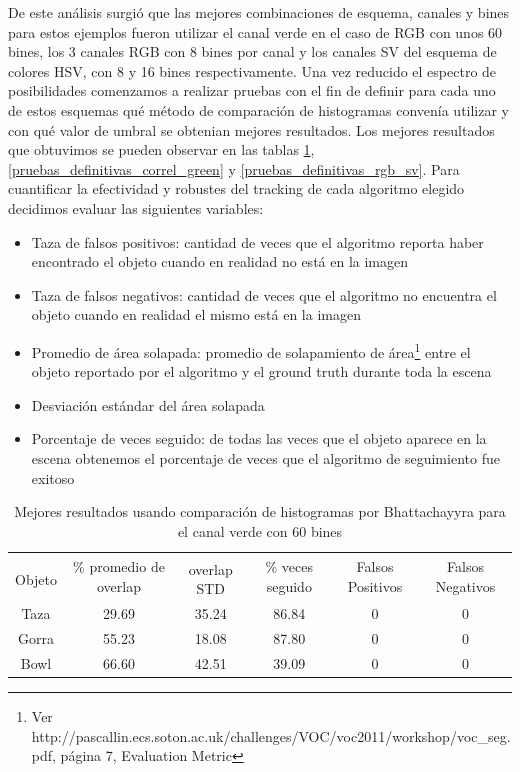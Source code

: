 De este análisis surgió que las mejores combinaciones de esquema, canales y bines para estos ejemplos fueron utilizar el canal verde en el caso de RGB con unos 60 bines, los 3 canales RGB con 8 bines por canal  y los canales SV del esquema de colores HSV, con 8 y 16 bines respectivamente. Una vez reducido el espectro de posibilidades comenzamos a realizar pruebas con el fin de definir para cada uno de estos esquemas qué método de comparación de histogramas convenía utilizar y con qué valor de umbral se obtenian mejores resultados. Los mejores resultados que obtuvimos se pueden observar en las tablas \ref{pruebas_definitivas_bhatta_green}, \ref{pruebas_definitivas_correl_green} y \ref{pruebas_definitivas_rgb_sv}. Para cuantificar la efectividad y robustes del tracking de cada algoritmo elegido decidimos evaluar las siguientes variables:
\begin{itemize}
	\item Taza de falsos positivos: cantidad de veces que el algoritmo reporta haber encontrado el objeto cuando en realidad no está en la imagen
	\item Taza de falsos negativos: cantidad de veces que el algoritmo no encuentra el objeto cuando en realidad el mismo está en la imagen
	\item Promedio de área solapada: promedio de solapamiento de área\footnote{Ver http://pascallin.ecs.soton.ac.uk/challenges/VOC/voc2011/workshop/voc\_seg.pdf, página 7, Evaluation Metric} entre el objeto reportado por el algoritmo y el ground truth durante toda la escena
	\item Desviación estándar del área solapada
	\item Porcentaje de veces seguido: de todas las veces que el objeto aparece en la escena obtenemos el porcentaje de veces que el algoritmo de seguimiento fue exitoso	
\end{itemize}

\begin{table}
	\begin{tabular}{|c|c|c|c|c|c|}
	    \hline
	    & \multirow{2}{2.4cm}{\% promedio de overlap} & & \multirow{2}{2cm}{\% veces seguido} & \multirow{2}{1.6cm}{Falsos Positivos} & \multirow{2}{1.6cm}{Falsos Negativos}\\
		Objeto & & overlap STD & & &\\
	    \hline
	    Taza   & 29.69      & 35.24       & 86.84             & 0                & 0\\
	    \hline
	    Gorra  & 55.23      & 18.08       & 87.80             & 0                & 0\\
	    \hline
	    Bowl   & 66.60      & 42.51       & 39.09             & 0                & 0\\
	    \hline
    \end{tabular}
	\caption{Mejores resultados usando comparación de histogramas por Bhattachayyra para el canal verde con 60 bines}
	\label{pruebas_definitivas_bhatta_green}
\end{table}


